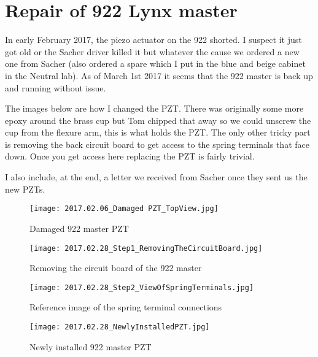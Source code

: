 \chapter{Repair of 922 Lynx master} \label{app:922repair}
In early February 2017, the piezo actuator on the 922 shorted. 
I suspect it just got old or the Sacher driver killed it but whatever the cause we ordered a new one from Sacher (also ordered a spare which I put in the blue and beige cabinet in the Neutral lab). 
As of March 1st 2017 it seems that the 922 master is back up and running without issue. 

The images below are how I changed the PZT. 
There was originally some more epoxy around the brass cup but Tom chipped that away so we could unscrew the cup from the flexure arm, this is what holds the PZT.
The only other tricky part is removing the back circuit board to get access to the spring terminals that face down.
Once you get access here replacing the PZT is fairly trivial.

I also include, at the end, a letter we received from Sacher once they sent us the new PZTs.
	\begin{figure}
		\centerline{
		\texttt{[image: 2017.02.06\_Damaged PZT\_TopView.jpg]}}
		\caption{Damaged 922 master PZT}
	\end{figure}
	\begin{figure}
		\centerline{
		\texttt{[image: 2017.02.28\_Step1\_RemovingTheCircuitBoard.jpg]}}
		\caption{Removing the circuit board of the 922 master}
	\end{figure} 
	\begin{figure}
		\centerline{
		\texttt{[image: 2017.02.28\_Step2\_ViewOfSpringTerminals.jpg]}}
		\caption{Reference image of the spring terminal connections}
	\end{figure} 
	\begin{figure}
		\centerline{
		\texttt{[image: 2017.02.28\_NewlyInstalledPZT.jpg]}}
		\caption{Newly installed 922 master PZT}
	\end{figure}
